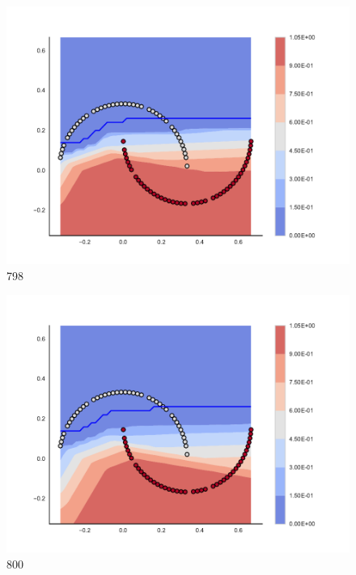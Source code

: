 \begin{subfigure}[b]{0.09\textwidth}
    \includegraphics[clip, trim=2.35cm 1.75cm 4.5cm 0cm,width=\textwidth]{img/convergence/798.pdf}
    \caption{798}
    \label{fig:convergence_798}
\end{subfigure}
%
\begin{subfigure}[b]{0.09\textwidth}
    \includegraphics[clip, trim=2.35cm 1.75cm 4.5cm 0cm,width=\textwidth]{img/convergence/800.pdf}
    \caption{800}
    \label{fig:convergence_800}
\end{subfigure}
%
